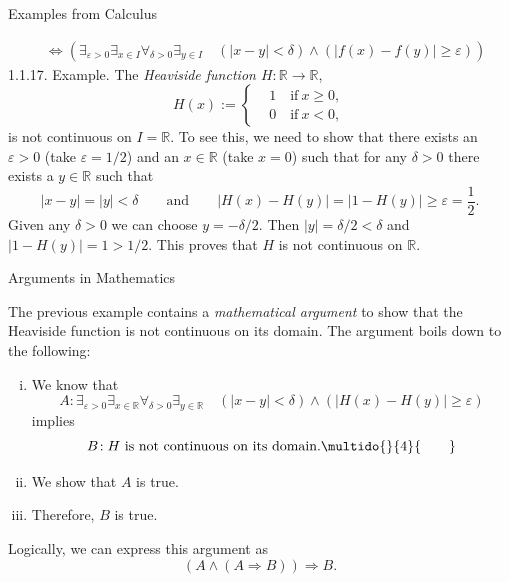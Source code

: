 \documentclass[smaller,hyperref={CJKbookmarks=true}]{beamer}
\newcommand{\R}{\mathbb{R}}
\begin{document}
\begin{frame}{Examples from Calculus}
\begin{spacing}{1.05}
\begin{align*}
   &\Leftrightarrow\left(\mathop{\exists}_{\varepsilon>0}
   \mathop{\exists}_{x\in I}\mathop{\forall}_{\delta>0}\mathop{\exists}_{y\in I}\quad(\vert x-y\vert<\delta)\wedge(\vert f(x)-f(y)\vert\geqslant\varepsilon)\right)
\end{align*}
\newpage
\vspace*{12pt}
\alert{1.1.17. Example.} The \emph{Heaviside function $H\!:\R\to\R$},
\[H(x):=\left\{\begin{aligned}
                 &\!1\quad\text{if}~x\geqslant0,\\
                 &\!0\quad\text{if}~x<0,
               \end{aligned}\right.\]
is not continuous on $I=\R$. To see this, we need to show that there exists an $\varepsilon>0$ (take $\varepsilon=1/2$) and an $x\in\R$ (take $x=0$) such that for any $\delta>0$ there exists a $y\in\R$ such that
\[\vert x-y\vert=\vert y\vert<\delta\qquad\text{and}\qquad
\vert H(x)-H(y)\vert=\vert1-H(y)\vert\geqslant
\varepsilon=\frac{1}{2}.\]
Given any $\delta>0$ we can choose $y=-\delta/2$. Then $\vert y\vert=\delta/2<\delta$ and $\vert1-H(y)\vert=1>1/2$. This proves that $H$ is not continuous on $\R$.
\end{spacing}
\end{frame}
\begin{frame}[t]{Arguments in Mathematics}
\begin{spacing}{1.05}
\vspace*{-4pt}
The previous example contains a \emph{mathematical argument} to show that the
Heaviside function is not continuous on its domain. The argument boils
down to the following:
\begin{enumerate}[(i)]
  \item We know that
  \[A\!:\mathop{\exists}_{\varepsilon>0}
  \mathop{\exists}_{x\in\R}\mathop{\forall}_{\delta>0}
  \mathop{\exists}_{y\in\R}\quad(\vert x-y\vert<\delta)\wedge(\vert H(x)-H(y)\vert\geqslant\varepsilon)\]
  implies
  \[B\!:H~\text{is not continuous on its domain.}\multido{}{4}{\qquad}\]
  \item We show that $A$ is true.
  \item Therefore, $B$ is true.
\end{enumerate}
Logically, we can express this argument as
\[\left(A\wedge(A\Rightarrow B)\right)\Rightarrow B.\]
\end{spacing}
\end{frame}
\end{document}
